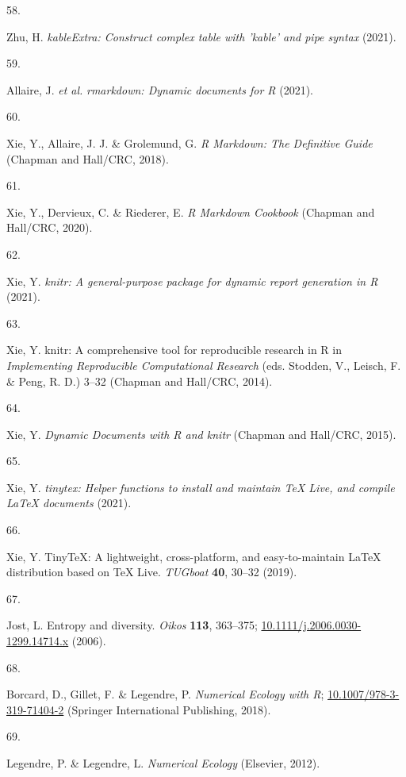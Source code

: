 \documentclass[
  12pt,
]{article}
\newlength{\cslhangindent}
\newlength{\csllabelwidth}
\newlength{\cslentryspacingunit} %
\newenvironment{CSLReferences}[2] %
 {%
  \setlength{\parindent}{0pt}
  \ifodd #1
  \let\oldpar\par
  \def\par{\hangindent=\cslhangindent\oldpar}
  \fi
  \setlength{\parskip}{#2\cslentryspacingunit}
 }%
 {}
\newcommand{\CSLLeftMargin}[1]{\parbox[t]{\csllabelwidth}{#1}}
\newcommand{\CSLRightInline}[1]{\parbox[t]{\linewidth - \csllabelwidth}{#1}\break}
\begin{document}
\begin{CSLReferences}{0}{0}
\leavevmode{}%
\CSLLeftMargin{58. }
\CSLRightInline{Zhu, H. \emph{{kableExtra}: Construct complex table with
'kable' and pipe syntax} (2021).}

\leavevmode{}%
\CSLLeftMargin{59. }
\CSLRightInline{Allaire, J. \emph{et al.} \emph{{rmarkdown}: Dynamic
documents for {R}} (2021).}

\leavevmode{}%
\CSLLeftMargin{60. }
\CSLRightInline{Xie, Y., Allaire, J. J. \& Grolemund, G. \emph{R
{Markdown}: {The Definitive Guide}} ({Chapman and Hall/CRC}, 2018).}

\leavevmode{}%
\CSLLeftMargin{61. }
\CSLRightInline{Xie, Y., Dervieux, C. \& Riederer, E. \emph{R {Markdown
Cookbook}} ({Chapman and Hall/CRC}, 2020).}

\leavevmode{}%
\CSLLeftMargin{62. }
\CSLRightInline{Xie, Y. \emph{{knitr}: A general-purpose package for
dynamic report generation in {R}} (2021).}

\leavevmode{}%
\CSLLeftMargin{63. }
\CSLRightInline{Xie, Y. {knitr}: A comprehensive tool for reproducible
research in {R} in \emph{Implementing {Reproducible Computational
Research}} (eds. Stodden, V., Leisch, F. \& Peng, R. D.) 3--32 ({Chapman
and Hall/CRC}, 2014).}

\leavevmode{}%
\CSLLeftMargin{64. }
\CSLRightInline{Xie, Y. \emph{Dynamic {Documents} with {R} and knitr}
({Chapman and Hall/CRC}, 2015).}

\leavevmode{}%
\CSLLeftMargin{65. }
\CSLRightInline{Xie, Y. \emph{{tinytex}: Helper functions to install and
maintain {TeX Live}, and compile {LaTeX} documents} (2021).}

\leavevmode{}%
\CSLLeftMargin{66. }
\CSLRightInline{Xie, Y. {TinyTeX}: A lightweight, cross-platform, and
easy-to-maintain {LaTeX} distribution based on {TeX Live}.
\emph{TUGboat} \textbf{40}, 30--32 (2019).}

\leavevmode{}%
\CSLLeftMargin{67. }
\CSLRightInline{Jost, L. Entropy and diversity. \emph{Oikos}
\textbf{113}, 363--375;
\href{https://doi.org/10.1111/j.2006.0030-1299.14714.x}{10.1111/j.2006.0030-1299.14714.x}
(2006).}

\leavevmode{}%
\CSLLeftMargin{68. }
\CSLRightInline{Borcard, D., Gillet, F. \& Legendre, P. \emph{Numerical
{Ecology} with {R}};
\href{https://doi.org/10.1007/978-3-319-71404-2}{10.1007/978-3-319-71404-2}
({Springer International Publishing}, 2018).}

\leavevmode{}%
\CSLLeftMargin{69. }
\CSLRightInline{Legendre, P. \& Legendre, L. \emph{Numerical {Ecology}}
({Elsevier}, 2012).}

\end{CSLReferences}
\end{document}
